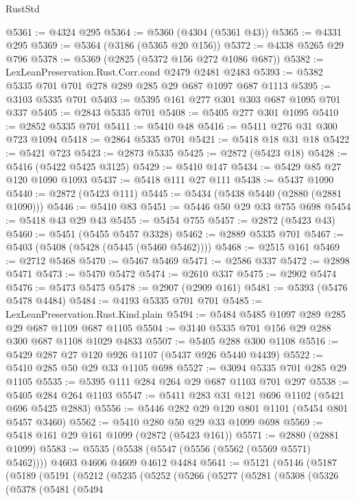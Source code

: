 \begin{lexlean}{RustStd}
\begin{coremodule}
@5361 := @4324 @295
@5364 := @5360 (@4304 (@5361 @43))
@5365 := @4331 @295
@5369 := @5364 (@3186 (@5365 @20 @156))
@5372 := @4338 @5265 @29 @796
@5378 := @5369 (@2825 (@5372 @156 @272 @1086 @687))
@5382 := LexLeanPreservation.Rust.Corr.cond @2479 @2481 @2483
@5393 := @5382 @5335 @701 @701 @278 @289 @285 @29 @687 @1097 @687 @1113
@5395 := @3103 @5335 @701
@5403 := @5395 @161 @277 @301 @303 @687 @1095 @701 @337
@5405 := @2843 @5335 @701
@5408 := @5405 @277 @301 @1095
@5410 := @2852 @5335 @701
@5411 := @5410 @48
@5416 := @5411 @276 @31 @300 @723 @1094
@5418 := @2864 @5335 @701
@5421 := @5418 @18 @31 @18
@5422 := @5421 @723
@5423 := @2873 @5335
@5425 := @2872 (@5423 @18)
@5428 := @5416 (@5422 @5425 @3125)
@5429 := @5410 @147
@5434 := @5429 @85 @27 @120 @1090 @1093
@5437 := @5418 @111 @27 @111
@5438 := @5437 @1090
@5440 := @2872 (@5423 @111)
@5445 := @5434 (@5438 @5440 (@2880 (@2881 @1090)))
@5446 := @5410 @83
@5451 := @5446 @50 @29 @33 @755 @698
@5454 := @5418 @43 @29 @43
@5455 := @5454 @755
@5457 := @2872 (@5423 @43)
@5460 := @5451 (@5455 @5457 @3328)
@5462 := @2889 @5335 @701
@5467 := @5403 (@5408 (@5428 (@5445 (@5460 @5462))))
@5468 := @2515 @161
@5469 := @2712 @5468
@5470 := @5467 @5469
@5471 := @2586 @337
@5472 := @2898 @5471
@5473 := @5470 @5472
@5474 := @2610 @337
@5475 := @2902 @5474
@5476 := @5473 @5475
@5478 := @2907 (@2909 @161)
@5481 := @5393 (@5476 @5478 @4484)
@5484 := @4193 @5335 @701 @701
@5485 := LexLeanPreservation.Rust.Kind.plain
@5494 := @5484 @5485 @1097 @289 @285 @29 @687 @1109 @687 @1105
@5504 := @3140 @5335 @701 @156 @29 @288 @300 @687 @1108 @1029 @4833
@5507 := @5405 @288 @300 @1108
@5516 := @5429 @287 @27 @120 @926 @1107 (@5437 @926 @5440 @4439)
@5522 := @5410 @285 @50 @29 @33 @1105 @698
@5527 := @3094 @5335 @701 @285 @29 @1105
@5535 := @5395 @111 @284 @264 @29 @687 @1103 @701 @297
@5538 := @5405 @284 @264 @1103
@5547 := @5411 @283 @31 @121 @696 @1102 (@5421 @696 @5425 @2883)
@5556 := @5446 @282 @29 @120 @801 @1101 (@5454 @801 @5457 @3460)
@5562 := @5410 @280 @50 @29 @33 @1099 @698
@5569 := @5418 @161 @29 @161 @1099 (@2872 (@5423 @161))
@5571 := @2880 (@2881 @1099)
@5583 := @5535 (@5538 (@5547 (@5556 (@5562 (@5569 @5571) @5462)))) @4603 @4606 @4609 @4612 @4484
@5641 := @5121
    (@5146
      (@5187
        (@5189
          (@5191
            (@5212
              (@5235
                (@5252
                  (@5266
                    (@5277
                      (@5281
                        (@5308
                          (@5326
                            (@5378
                              (@5481
                                (@5494

\end{coremodule}
\end{lexlean}
